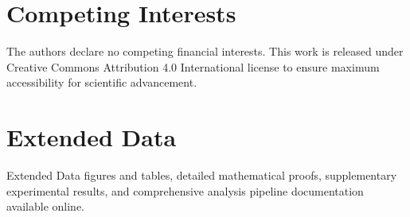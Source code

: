 \documentclass[fleqn,10pt,lineno]{article}
\begin{document}
\section*{Competing Interests}

The authors declare no competing financial interests. This work is released under Creative Commons Attribution 4.0 International license to ensure maximum accessibility for scientific advancement.

\section*{Extended Data}

Extended Data figures and tables, detailed mathematical proofs, supplementary experimental results, and comprehensive analysis pipeline documentation available online.


\end{document}
